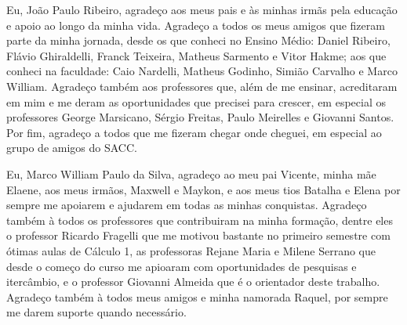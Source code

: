 \begin{agradecimentos}
Eu, João Paulo Ribeiro, agradeço aos meus pais e às minhas irmãs pela educação e apoio ao longo da minha vida. Agradeço a todos os meus amigos que fizeram parte da minha jornada, desde os que conheci no Ensino Médio: Daniel Ribeiro, Flávio Ghiraldelli, Franck Teixeira, Matheus Sarmento e Vitor Hakme; aos que conheci na faculdade: Caio Nardelli, Matheus Godinho, Simião Carvalho e Marco William. Agradeço também aos professores que, além de me ensinar, acreditaram em mim e me deram as oportunidades que precisei para crescer, em especial os professores George Marsicano, Sérgio Freitas, Paulo Meirelles e Giovanni Santos. Por fim, agradeço a todos que me fizeram chegar onde cheguei, em especial ao grupo de amigos do SACC.

Eu, Marco William Paulo da Silva, agradeço ao meu pai Vicente, minha mãe Elaene, aos meus irmãos, Maxwell e Maykon, e aos meus tios Batalha e Elena por sempre me apoiarem e ajudarem em todas as minhas conquistas. Agradeço também à todos os professores que contribuiram na minha formação, dentre eles o professor Ricardo Fragelli que me motivou bastante no primeiro semestre com ótimas aulas de Cálculo 1, as professoras Rejane Maria e Milene Serrano que desde o começo do curso me apioaram com oportunidades de pesquisas e itercâmbio, e o professor Giovanni Almeida que é o orientador deste trabalho. Agradeço também à todos meus amigos e minha namorada Raquel, por sempre me darem suporte quando necessário.
\end{agradecimentos}
